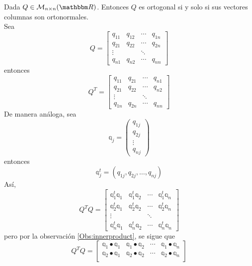 \begin{theorem}\label{Qorto_vectoresorto}
    Dada $Q \in \mathcal{M}_{n \times n}(\RR)$. Entonces $Q$ es ortogonal si y solo si sus vectores columnas son ortonormales. \\
    \demostracion Sea
    $$Q = \begin{bmatrix}
        q_{11} & q_{12} & \cdots & q_{1n} \\
        q_{21} & q_{22} & \cdots & q_{2n} \\
        \vdots & & \ddots & \\
        q_{n1} & q_{n2} & \cdots & q_{nn}
    \end{bmatrix}$$
    entonces
    $$Q^T = \begin{bmatrix}
        q_{11} & q_{21} & \cdots & q_{n1} \\
        q_{21} & q_{22} & \cdots & q_{n2} \\
        \vdots & & \ddots & \\
        q_{1n} & q_{2n} & \cdots & q_{nn}
    \end{bmatrix}$$
    De manera análoga, sea
    $$\mathbb{q}_j = \begin{pmatrix}
        q_{1j} \\
        q_{2j} \\
        \vdots \\
        q_{nj}
    \end{pmatrix}$$
    entonces
    $$\mathbb{q}_j^t = (q_{1j}, q_{2j}, \dots, q_{nj})$$
    Así,
    $$Q^TQ = \begin{bmatrix}
        \mathbb{q}_1^t \mathbb{q}_1 & \mathbb{q}_1^t \mathbb{q}_2 & \cdots & \mathbb{q}_1^t \mathbb{q}_n \\
        \mathbb{q}_2^t \mathbb{q}_1 & \mathbb{q}_2^t \mathbb{q}_2 & \cdots & \mathbb{q}_2^t \mathbb{q}_n \\
        \vdots & & \ddots & \\
        \mathbb{q}_n^t \mathbb{q}_1 & \mathbb{q}_n^t \mathbb{q}_2 & \cdots & \mathbb{q}_n^t \mathbb{q}_n
    \end{bmatrix}$$\newpage\noindent
    pero por la observación \ref{Obs:innerproduct}, se sigue que
    \begin{equation}
        Q^TQ = \begin{bmatrix}
            \mathbb{q}_1 \bullet \mathbb{q}_1 & \mathbb{q}_1 \bullet \mathbb{q}_2 & \cdots & \mathbb{q}_1 \bullet \mathbb{q}_n \\
            \mathbb{q}_2 \bullet \mathbb{q}_1 & \mathbb{q}_2 \bullet \mathbb{q}_2 & \cdots & \mathbb{q}_2 \bullet \mathbb{q}_n \\

\end{bmatrix}
\end{equation}
\end{theorem}
